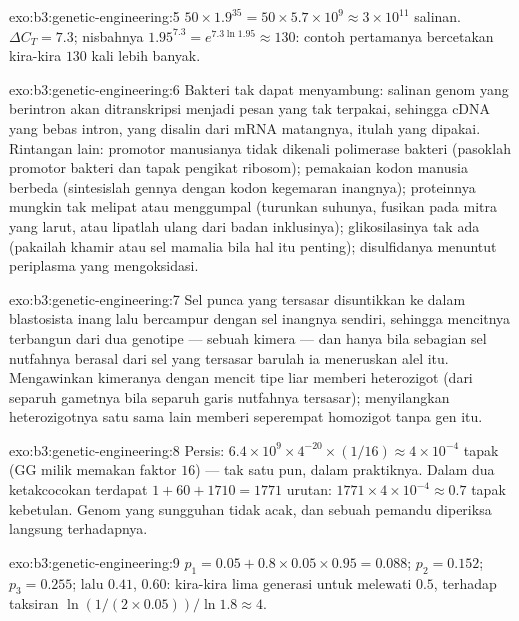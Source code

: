 \begin{solution}{exo:b3:genetic-engineering:5}
$50\times 1.9^{35} = 50\times 5.7\times 10^{9} \approx 3\times 10^{11}$
salinan. $\Delta C_{T} = 7.3$; nisbahnya $1.95^{7.3} = e^{7.3\ln 1.95}
\approx 130$: contoh pertamanya bercetakan kira-kira $130$ kali lebih banyak.
\end{solution}

\begin{solution}{exo:b3:genetic-engineering:6}
Bakteri tak dapat menyambung: salinan genom yang berintron akan
ditranskripsi menjadi pesan yang tak terpakai, sehingga cDNA yang bebas
intron, yang disalin dari mRNA matangnya, itulah yang dipakai. Rintangan lain:
promotor manusianya tidak dikenali polimerase bakteri (pasoklah promotor
bakteri dan tapak pengikat ribosom); pemakaian kodon manusia berbeda (sintesislah
gennya dengan kodon kegemaran inangnya); proteinnya mungkin tak melipat atau
menggumpal (turunkan suhunya, fusikan pada mitra yang larut, atau lipatlah
ulang dari badan inklusinya); glikosilasinya tak ada (pakailah khamir atau sel
mamalia bila hal itu penting); disulfidanya menuntut periplasma yang
mengoksidasi.
\end{solution}

\begin{solution}{exo:b3:genetic-engineering:7}
Sel punca yang tersasar disuntikkan ke dalam blastosista inang lalu bercampur
dengan sel inangnya sendiri, sehingga mencitnya terbangun dari dua genotipe ---
sebuah kimera --- dan hanya bila sebagian sel nutfahnya berasal dari sel yang
tersasar barulah ia meneruskan alel itu. Mengawinkan kimeranya dengan mencit
tipe liar memberi heterozigot (dari separuh gametnya bila separuh garis
nutfahnya tersasar); menyilangkan heterozigotnya satu sama lain memberi
seperempat homozigot tanpa gen itu.
\end{solution}

\begin{solution}{exo:b3:genetic-engineering:8}
Persis: $6.4\times 10^{9}\times 4^{-20}\times (1/16) \approx 4\times
10^{-4}$ tapak (GG milik  memakan faktor $16$) --- tak satu pun, dalam
praktiknya. Dalam dua ketakcocokan terdapat $1 + 60 + 1710 = 1771$
urutan: $1771\times 4\times 10^{-4} \approx 0.7$ tapak kebetulan. Genom
yang sungguhan tidak acak, dan sebuah pemandu diperiksa langsung terhadapnya.
\end{solution}

\begin{solution}{exo:b3:genetic-engineering:9}
$p_{1} = 0.05 + 0.8\times 0.05\times 0.95 = 0.088$; $p_{2} = 0.152$;
$p_{3} = 0.255$; lalu $0.41$, $0.60$: kira-kira lima generasi untuk melewati
$0.5$, terhadap taksiran $\ln(1/(2\times 0.05))/\ln 1.8 \approx 4$.
\end{solution}

